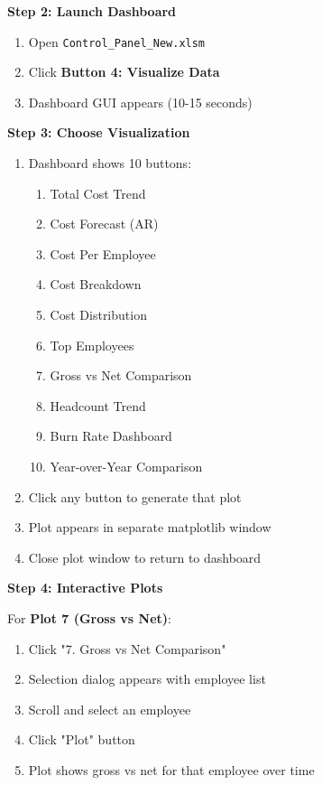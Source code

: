\textbf{Step 2: Launch Dashboard}

\begin{enumerate}
    \item Open \texttt{Control\_Panel\_New.xlsm}
    \item Click \textbf{Button 4: Visualize Data}
    \item Dashboard GUI appears (10-15 seconds)
\end{enumerate}

\textbf{Step 3: Choose Visualization}

\begin{enumerate}
    \item Dashboard shows 10 buttons:
    \begin{enumerate}
        \item Total Cost Trend
        \item Cost Forecast (AR)
        \item Cost Per Employee
        \item Cost Breakdown
        \item Cost Distribution
        \item Top Employees
        \item Gross vs Net Comparison
        \item Headcount Trend
        \item Burn Rate Dashboard
        \item Year-over-Year Comparison
    \end{enumerate}
    
    \item Click any button to generate that plot
    \item Plot appears in separate matplotlib window
    \item Close plot window to return to dashboard
\end{enumerate}

\textbf{Step 4: Interactive Plots}

For \textbf{Plot 7 (Gross vs Net)}:
\begin{enumerate}
    \item Click "7. Gross vs Net Comparison"
    \item Selection dialog appears with employee list
    \item Scroll and select an employee
    \item Click "Plot" button
    \item Plot shows gross vs net for that employee over time
\end{enumerate}

